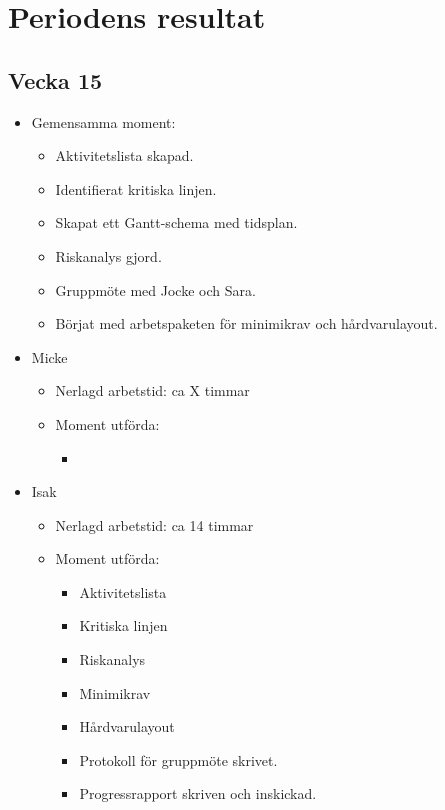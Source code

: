 \section{Periodens resultat}
\subsection*{Vecka 15}

\begin{itemize}[noitemsep]
    \item Gemensamma moment:
    \begin{itemize}[noitemsep]
        \item Aktivitetslista skapad.
        \item Identifierat kritiska linjen.
        \item Skapat ett Gantt-schema med tidsplan.
        \item Riskanalys gjord.
        \item Gruppmöte med Jocke och Sara.
        \item Börjat med arbetspaketen för minimikrav och hårdvarulayout.
    \end{itemize}
    \item Micke
    \begin{itemize}[noitemsep]
        \item Nerlagd arbetstid: ca X timmar
        \item Moment utförda:
        \begin{itemize}[noitemsep]
            \item 
		\end{itemize}           
    \end{itemize}
    \item Isak
    \begin{itemize}[noitemsep]
        \item Nerlagd arbetstid: ca 14 timmar
        \item Moment utförda:
        \begin{itemize}[noitemsep]
            \item Aktivitetslista
            \item Kritiska linjen
            \item Riskanalys
            \item Minimikrav
            \item Hårdvarulayout
            \item Protokoll för gruppmöte skrivet.
            \item Progressrapport skriven och inskickad.

\end{itemize}
\end{itemize}
\end{itemize}
